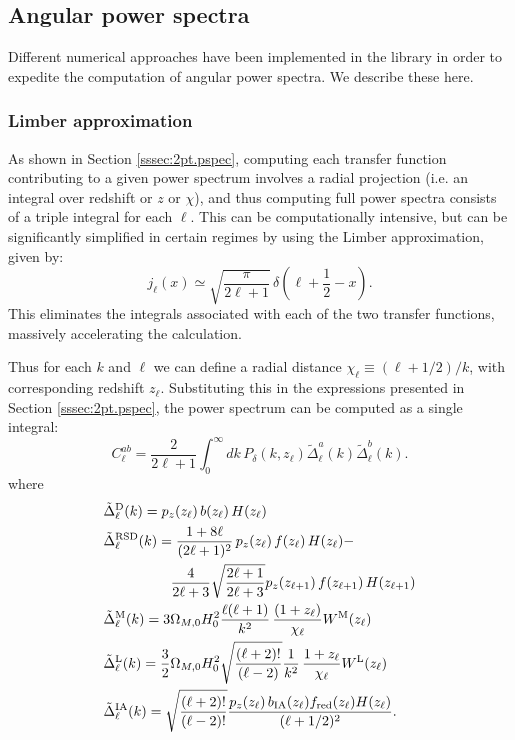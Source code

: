 \documentclass[\docopts]{\docclass}
\begin{document}
\subsection{Angular power spectra}

Different numerical approaches have been implemented in the library in order to expedite the computation of angular power spectra. We describe these here.

\subsubsection{Limber approximation}

As shown in Section \ref{sssec:2pt.pspec}, computing each transfer function contributing to a given power spectrum involves a radial projection (i.e. an integral over redshift or $z$ or $\chi$), and thus computing full power spectra consists of a triple integral for each $\ell$. This can be computationally intensive, but can be significantly simplified in certain regimes by using the Limber approximation, given by:
\begin{equation}
 j_\ell(x)\simeq\sqrt{\frac{\pi}{2\ell+1}}\,\delta\left(\ell+\frac{1}{2}-x\right).
\end{equation}
This eliminates the integrals associated with each of the two transfer functions, massively accelerating the calculation.

Thus for each $k$ and $\ell$ we can define a radial distance $\chi_\ell\equiv(\ell+1/2)/k$, with corresponding redshift $z_\ell$. Substituting this in the expressions presented in Section \ref{sssec:2pt.pspec}, the power spectrum can be computed as a single integral:
\begin{equation}\label{eq:limber}
 C^{ab}_\ell=\frac{2}{2\ell+1}\int_0^\infty dk\,P_\delta\left(k,z_\ell\right)
 \tilde{\Delta}^a_\ell(k)\tilde{\Delta}^b_\ell(k).
\end{equation}
where
\begin{align}
 &\tilde{\Delta}_\ell^{\rm D}(k)=p_z(z_\ell)\,b(z_\ell)\,H(z_\ell)\\
 &\tilde{\Delta}_\ell^{\rm RSD}(k)=
 \frac{1+8\ell}{(2\ell+1)^2}\,p_z(z_\ell)\,f(z_\ell)\,H(z_\ell)-\\\nonumber
 &\hspace{48pt}\frac{4}{2\ell+3}\sqrt{\frac{2\ell+1}{2\ell+3}}p_z(z_{\ell+1})\,f(z_{\ell+1})\,H(z_{\ell+1})\\
 &\tilde{\Delta}_\ell^{\rm M}(k)=3\Omega_{M,0}H_0^2\frac{\ell(\ell+1)}{k^2}\,
 \frac{(1+z_\ell)}{\chi_\ell}W^{\rm M}(z_\ell)\\
 &\tilde{\Delta}_\ell^{\rm L}(k)=\frac{3}{2}\Omega_{M,0}H_0^2\sqrt{\frac{(\ell+2)!}{(\ell-2)}}\frac{1}{k^2}\,
 \frac{1+z_\ell}{\chi_\ell}W^{\rm L}(z_\ell)\\
 &\tilde{\Delta}_\ell^{\rm IA}(k)=\sqrt{\frac{(\ell+2)!}{(\ell-2)!}}\frac{p_z(z_\ell)\,b_{\rm IA}(z_\ell)f_{\rm red}(z_\ell)H(z_\ell)}{(\ell+1/2)^2}.
\end{align}
\end{document}
